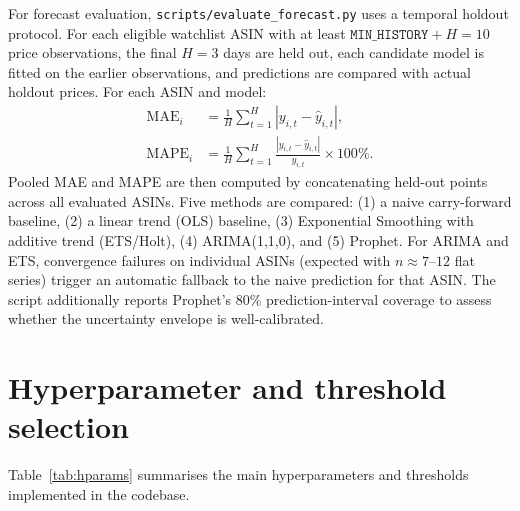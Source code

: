 For forecast evaluation, \texttt{scripts/evaluate\_forecast.py} uses a
temporal holdout protocol. For each eligible watchlist ASIN with at
least $\texttt{MIN\_HISTORY} + H = 10$ price observations, the final
$H = 3$ days are held out, each candidate model is fitted on the earlier
observations, and predictions are compared with actual holdout prices.
For each ASIN and model:
\begin{align}
  \text{MAE}_i  &= \frac{1}{H}\sum_{t=1}^{H} |y_{i,t} - \hat{y}_{i,t}|, \\
  \text{MAPE}_i &= \frac{1}{H}\sum_{t=1}^{H}
  \frac{|y_{i,t} - \hat{y}_{i,t}|}{y_{i,t}} \times 100\%.
\end{align}
Pooled MAE and MAPE are then computed by concatenating held-out points
across all evaluated ASINs. Five methods are compared: (1) a naive
carry-forward baseline, (2) a linear trend (OLS) baseline, (3)
Exponential Smoothing with additive trend (ETS/Holt), (4) ARIMA(1,1,0),
and (5) Prophet. For ARIMA and ETS, convergence failures on individual
ASINs (expected with $n \approx 7$--$12$ flat series) trigger an
automatic fallback to the naive prediction for that ASIN. The script
additionally reports Prophet's 80\% prediction-interval coverage to
assess whether the uncertainty envelope is well-calibrated.

\section{Hyperparameter and threshold selection}
\label{sec:hparams}

Table~\ref{tab:hparams} summarises the main hyperparameters and
thresholds implemented in the codebase.


